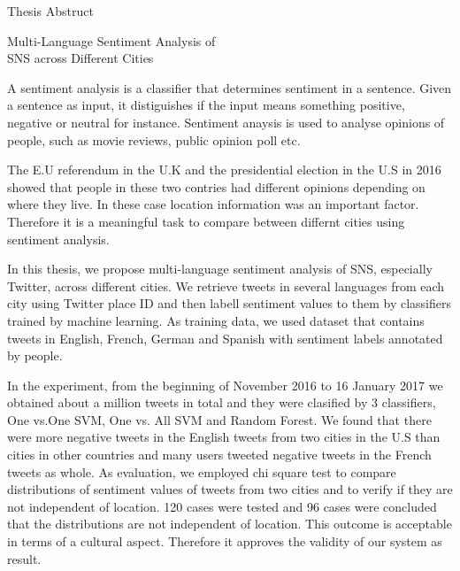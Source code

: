 \newpage

\thispagestyle{empty}
\vspace*{2.0cm}

\begin{center}
\LARGE{Thesis Abstruct}
\end{center}
\vspace{3mm}

\begin{center}
\LARGE{Multi-Language Sentiment Analysis of\\SNS across Different Cities}
\end{center}

\vspace{20mm}
\setlength\parindent{2zw}
A sentiment analysis is a classifier that determines sentiment in a sentence.
Given a sentence as input, it distiguishes if the input means something positive, negative or neutral for instance.
Sentiment anaysis is used to analyse opinions of people, such as movie reviews, public opinion poll etc.

The E.U referendum in the U.K and the presidential election in the U.S in 2016 showed that people in these two contries had different opinions depending on where they live.
In these case location information was an important factor.
Therefore it is a meaningful task to compare between differnt cities using sentiment analysis.

In this thesis, we propose multi-language sentiment analysis of SNS, especially Twitter, across different cities.
We retrieve tweets in several languages from each city using Twitter place ID and then labell sentiment values to them by classifiers trained by machine learning.
As training data, we used dataset that contains tweets in English, French, German and Spanish with sentiment labels annotated by people. 

In the experiment, from the beginning of November 2016 to 16 January 2017 we obtained about a million tweets in total and they were clasified by 3 classifiers, One vs.One SVM, One vs. All SVM and Random Forest.
We found that there were more negative tweets in the English tweets from two cities in the U.S than cities in other countries and many users tweeted negative tweets in the French tweets as whole. 
As evaluation, we employed chi square test to compare distributions of sentiment values of tweets from two cities and to verify if they are not independent of location.
120 cases were tested and 96 cases were concluded that the distributions are not independent of location.
This outcome is acceptable in terms of a cultural aspect.
Therefore it approves the validity of our system as result.

